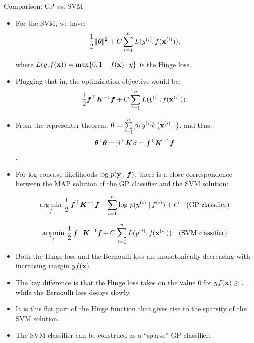 \begin{frame}[c,allowframebreaks]{Comparison: GP vs. SVM}


\begin{itemize}
\item For the SVM, we have: 
\vspace{-2mm}
$$\frac{1}{2} \|\bm{\theta}\|^2 + C \sum\limits_{i=1}^n L(y^{(i)},f(\mathbf{x}^{(i)})),$$

\vspace{-2mm}
where $L(y,f(\mathbf{x}))  = \max\{0, 1-f(\mathbf{x})\cdot y\}$ is the Hinge loss.


\vspace{.5cm}
\item Plugging that in, the optimization objective would be:
\vspace{-2mm}
$$\frac{1}{2} \bm{f}^\top \bm{K}^{-1} \bm{f} + C \sum\limits_{i=1}^n L(y^{(i)},f(\mathbf{x}^{(i)})).$$


\vspace{.1cm}
\item From the representer theorem: $\bm{\theta} = \sum\limits_{i=1}^n \beta_i\,y^{(i)} k\left(\mathbf{x}^{(i)}, \cdot \right)$, and thus:
\vspace{-2mm}
$$\bm{\theta}^\top \bm{\theta} = \beta^\top \bm{K} \beta = \bm{f}^\top \bm{K}^{-1} \bm{f}$$. 

\end{itemize}



\framebreak

\begin{itemize}
\item For log-concave likelihoods $\log\, p(\mathbf{y}\mid \bm{f})$, there is a close correspondence between the MAP solution of the GP classifier and the SVM solution:

\lz

$$\operatorname*{arg\,min}_f\,\frac{1}{2}\,\bm{f}^\top \bm{K}^{-1} \bm{f}- \sum\limits_{i=1}^n \log\, p(y^{(i)}\mid f^{(i)}) + C \quad \text{(GP classifier)}$$

\lz

$$\operatorname*{arg\,min}_f\,\frac{1}{2}\, \bm{f}^\top \bm{K}^{-1} \bm{f} + C \sum\limits_{i=1}^n L(y^{(i)},f(\mathbf{x}^{(i)})) \quad \text{(SVM classifier)}$$
\end{itemize}


\framebreak

\begin{itemize}
\item Both the Hinge loss and the Bernoulli loss are monotonically decreasing with increasing margin $y f(\mathbf{x})$. 
\item The key difference is that the Hinge loss takes on the value $0$ for $y f(\mathbf{x}) \ge 1$, while the Bernoulli loss decays slowly.
\item It is this flat part of the Hinge function that gives rise to the sparsity of the SVM solution. 
\item The SVM classifier can be construed as a ``sparse'' GP classifier.
\end{itemize}


\end{frame}
